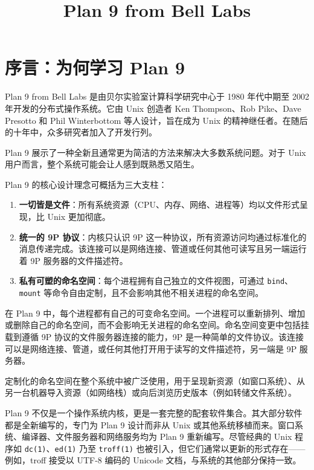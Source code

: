 \documentclass[12pt,UTF8]{ctexbook}
\title{\heiti\zihao{0} Plan 9 from Bell Labs}
\author{}
\date{}
\begin{document}
	
\maketitle
\tableofcontents
	
\frontmatter

\chapter{序言：为何学习 Plan 9}
	
Plan 9 from Bell Labs 是由贝尔实验室计算科学研究中心于 1980 年代中期至 2002 年开发的分布式操作系统。它由 Unix 创造者 Ken Thompson、Rob Pike、Dave Presotto 和 Phil Winterbottom 等人设计，旨在成为 Unix 的精神继任者。在随后的十年中，众多研究者加入了开发行列。
	
Plan 9 展示了一种全新且通常更为简洁的方法来解决大多数系统问题。对于 Unix 用户而言，整个系统可能会让人感到既熟悉又陌生。
	
Plan 9 的核心设计理念可概括为三大支柱：

\begin{enumerate}
\item \textbf{一切皆是文件}：所有系统资源（CPU、内存、网络、进程等）均以文件形式呈现，比 Unix 更加彻底。
\item \textbf{统一的 9P 协议}：内核只认识 9P 这一种协议，所有资源访问均通过标准化的消息传递完成。该连接可以是网络连接、管道或任何其他可读写且另一端运行着 9P 服务器的文件描述符。
\item \textbf{私有可塑的命名空间}：每个进程拥有自己独立的文件视图，可通过 \texttt{bind}、\texttt{mount} 等命令自由定制，且不会影响其他不相关进程的命名空间。
\end{enumerate}

在 Plan 9 中，每个进程都有自己的可变命名空间。一个进程可以重新排列、增加或删除自己的命名空间，而不会影响无关进程的命名空间。命名空间变更中包括挂载到遵循 9P 协议的文件服务器连接的能力，9P 是一种简单的文件协议。该连接可以是网络连接、管道，或任何其他打开用于读写的文件描述符，另一端是 9P 服务器。
	
定制化的命名空间在整个系统中被广泛使用，用于呈现新资源（如窗口系统）、从另一台机器导入资源（如网络栈）或向后浏览历史版本（例如转储文件系统）。
	
Plan 9 不仅是一个操作系统内核，更是一套完整的配套软件集合。其大部分软件都是全新编写的，专门为 Plan 9 设计而非从 Unix 或其他系统移植而来。窗口系统、编译器、文件服务器和网络服务均为 Plan 9 重新编写。尽管经典的 Unix 程序如 \texttt{dc(1)}、\texttt{ed(1)} 乃至 \texttt{troff(1)} 也被引入，但它们通常以更新的形式存在——例如，troff 接受以 UTF-8 编码的 Unicode 文档，与系统的其他部分保持一致。
	
\end{document}
